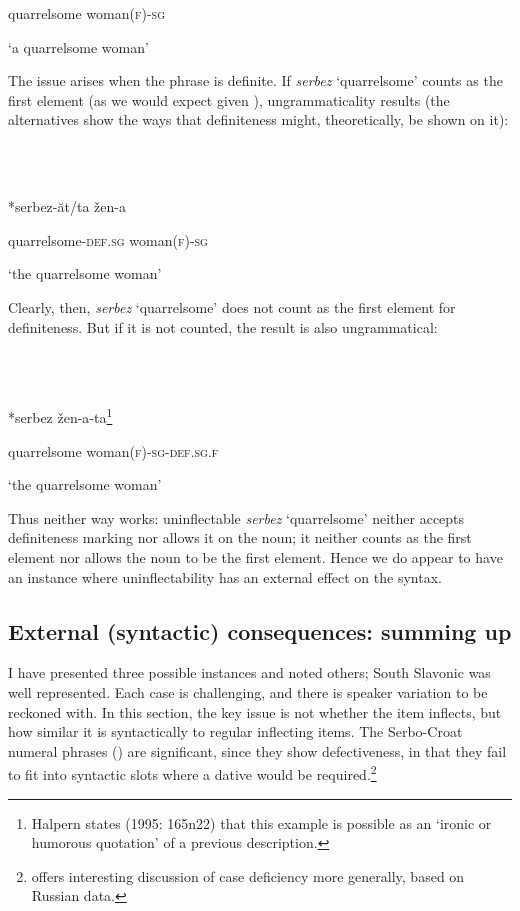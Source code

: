 \documentclass[output=paper]{langscibook}
\begin{document}
  quarrelsome  woman\textsc{(f)-sg}

  ‘a quarrelsome woman’

The issue arises when the phrase is definite. If \textit{serbez} ‘quarrelsome’ counts as the first element (as we would expect given ), ungrammaticality results (the alternatives show the ways that definiteness might, theoretically, be shown on it): 

\ea%
    \label{ex:key:29}
    \gll \\
         \\
    \glt
    \z %

          *serbez-ăt/ta    žen-a

  quarrelsome-\textsc{def.sg}   woman\textsc{(f)-sg}

  ‘the quarrelsome woman’

Clearly, then, \textit{serbez} ‘quarrelsome’ does not count as the first element for definiteness. But if it is not counted, the result is also ungrammatical:

\ea%
    \label{ex:key:30}
    \gll \\
         \\
    \glt
    \z %

          *serbez  žen-a-ta\footnote{\textrm{Halpern states (1995: 165n22) that this example is possible as an ‘ironic or humorous quotation’ of a previous description.}}

  quarrelsome  woman\textsc{(f)}{}-\textsc{sg-def.sg.f}

  ‘the quarrelsome woman’

Thus neither way works: uninflectable \textit{serbez} ‘quarrelsome’ neither accepts definiteness marking nor allows it on the noun; it neither counts as the first element nor allows the noun to be the first element. Hence we do appear to have an instance where uninflectability has an external effect on the syntax.

\subsection{\textbf{External} \textbf{(syntactic)} \textbf{consequences:} \textbf{summing} \textbf{up}}

I have presented three possible instances and noted others; South Slavonic was well represented. Each case is challenging, and there is speaker variation to be reckoned with. In this section, the key issue is not whether the item inflects, but how similar it is syntactically to regular inflecting items. The Serbo-Croat numeral phrases () are significant, since they show defectiveness, in that they fail to fit into syntactic slots where a dative would be required.\footnote{ \textrm{\citet{Testelets2010} offers interesting discussion of case deficiency more generally, based on Russian data.}} 
\end{document}
